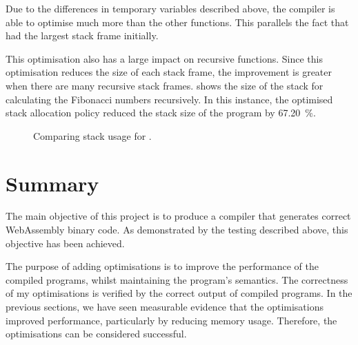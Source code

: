 \documentclass[00-main.tex]{subfiles}
\begin{document}
Due to the differences in temporary variables described above, the compiler is able to optimise  much more than the other functions.
This parallels the fact that  had the largest stack frame initially.


This optimisation also has a large impact on recursive functions.
Since this optimisation reduces the size of each stack frame, the improvement is greater when there are many recursive stack frames.
 shows the size of the stack for calculating the Fibonacci numbers recursively.
In this instance, the optimised stack allocation policy reduced the stack size of the program by \SI{67.20}{\percent}.


\begin{figure}[t]
  \centering
  \caption{Comparing stack usage for .}
  \label{fig:comparing stack usage for fibonacci.c} %
\end{figure}



\section{Summary}

The main objective of this project is to produce a compiler that generates correct WebAssembly binary code.
As demonstrated by the testing described above, this objective has been achieved.

The purpose of adding optimisations is to improve the performance of the compiled programs, whilst maintaining the program's semantics.
The correctness of my optimisations is verified by the correct output of compiled programs.
In the previous sections, we have seen measurable evidence that the optimisations improved performance, particularly by reducing memory usage.
Therefore, the optimisations can be considered successful.
\end{document}
